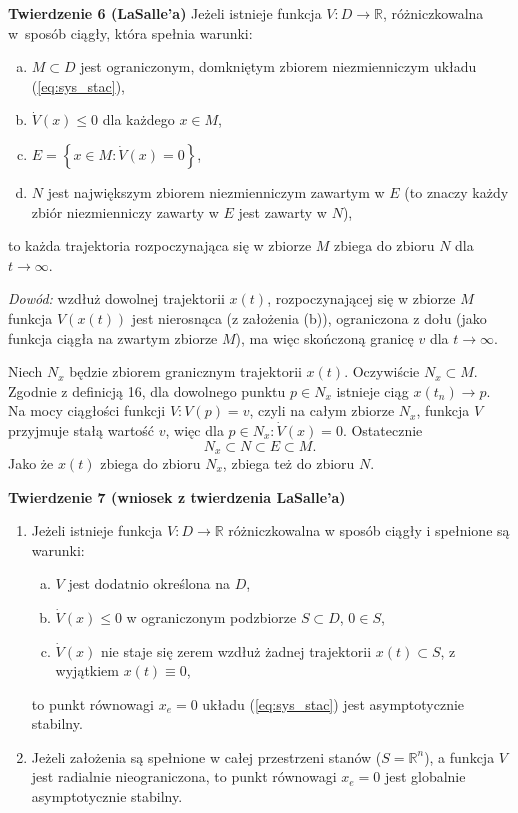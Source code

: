 \documentclass{article}
\begin{document}
\textbf{Twierdzenie 6 (LaSalle'a)}
Jeżeli istnieje funkcja $V:D\rightarrow\mathbb{R}$, różniczkowalna w~sposób ciągły, która spełnia warunki:
\begin{enumerate}[(a)]
    \item $M \subset D$ jest ograniczonym, domkniętym zbiorem niezmienniczym układu (\ref{eq:sys_stac}),
    \item $\dot{V}(x) \leq 0$ dla każdego $x\in M$,
    \item $E = \left\{ x\in M:\dot{V}(x) = 0 \right\}$,
    \item $N$ jest największym zbiorem niezmienniczym zawartym w $E$ (to znaczy każdy zbiór niezmienniczy zawarty w $E$ jest zawarty w $N$),
\end{enumerate}
to każda trajektoria rozpoczynająca się w zbiorze $M$ zbiega do zbioru $N$ dla $t\rightarrow\infty$.

\textit{Dowód:}
wzdłuż dowolnej trajektorii $x(t)$, rozpoczynającej się w zbiorze $M$ funkcja $V(x(t))$ jest nierosnąca (z założenia (b)), ograniczona z dołu (jako funkcja ciągła na zwartym zbiorze $M$), ma więc skończoną granicę $v$ dla $t \rightarrow \infty$.

Niech $N_{x}$ będzie zbiorem granicznym trajektorii $x(t)$.
Oczywiście $N_{x} \subset M$. Zgodnie z definicją 16, dla dowolnego punktu $p\in N_{x}$ istnieje ciąg $x(t_{n}) \rightarrow p$.
Na mocy ciągłości funkcji $V: V(p) = v$, czyli na całym zbiorze $N_{x}$, funkcja $V$ przyjmuje stałą wartość $v$, więc dla $p \in N_{x} : \dot{V}(x)=0$.
Ostatecznie
$$
    N_{x} \subset N \subset E \subset M.
$$
Jako że $x(t)$ zbiega do zbioru $N_{x}$, zbiega też do zbioru $N$.

\textbf{Twierdzenie 7 (wniosek z twierdzenia LaSalle'a)}
\begin{enumerate}
    \item Jeżeli istnieje funkcja $V:D\rightarrow\mathbb{R}$ różniczkowalna w sposób ciągły i spełnione są warunki:
    \begin{enumerate}[(a)]
        \item $V$ jest dodatnio określona na $D$,
        \item $\dot{V}(x) \leq 0$ w ograniczonym podzbiorze $S \subset D$, $0 \in S$,
        \item $\dot{V}(x)$ nie staje się zerem wzdłuż żadnej trajektorii $x(t) \subset S$, z wyjątkiem $x(t) \equiv 0$,
    \end{enumerate}
    to punkt równowagi $x_{e} = 0$ układu (\ref{eq:sys_stac}) jest asymptotycznie stabilny.

    \item Jeżeli założenia są spełnione w całej przestrzeni stanów ($S = \mathbb{R}^{n}$), a funkcja $V$ jest radialnie nieograniczona, to punkt równowagi $x_{e} = 0$ jest globalnie asymptotycznie stabilny.
\end{enumerate}
\end{document}
